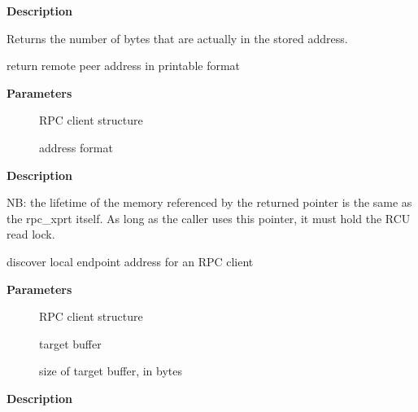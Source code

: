 \documentclass[a4paper,8pt,english]{sphinxmanual}
\begin{document}
\textbf{Description}

Returns the number of bytes that are actually in the stored address.

\begin{fulllineitems}
\label{networking/kapi:c.rpc_peeraddr2str}
return remote peer address in printable format

\end{fulllineitems}


\textbf{Parameters}
\begin{description}
\item[{}] \leavevmode
RPC client structure

\item[{}] \leavevmode
address format

\end{description}

\textbf{Description}

NB: the lifetime of the memory referenced by the returned pointer is
the same as the rpc\_xprt itself.  As long as the caller uses this
pointer, it must hold the RCU read lock.

\begin{fulllineitems}
\label{networking/kapi:c.rpc_localaddr}
discover local endpoint address for an RPC client

\end{fulllineitems}


\textbf{Parameters}
\begin{description}
\item[{}] \leavevmode
RPC client structure

\item[{}] \leavevmode
target buffer

\item[{}] \leavevmode
size of target buffer, in bytes

\end{description}

\textbf{Description}
\end{document}
